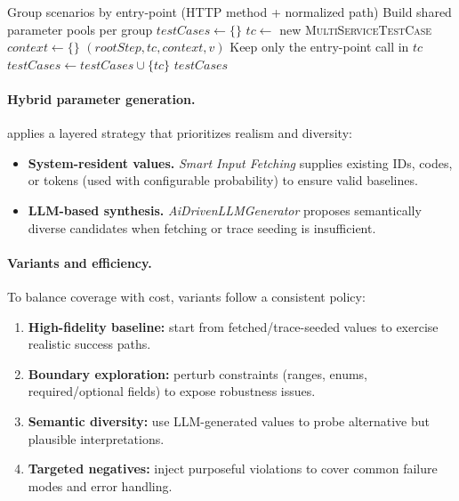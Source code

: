 \documentclass[conference]{IEEEtran}
\begin{document}
\begin{algorithm}[tb]
\caption{TEST\_GENERATOR}
\label{alg:generate}
\footnotesize
\begin{algorithmic}[1]
\Require{}
\Ensure{}
\State Group scenarios by entry-point (HTTP method + normalized path)
\State Build shared parameter pools per group
\State $testCases \gets \{\}$
        \State $tc \gets$ new \textsc{MultiServiceTestCase}
        \State $context \gets \{\}$ 
            \State {}$(rootStep, tc, context, v)$
        \EndFor
        \State Keep only the entry-point call in $tc$ 
        \State $testCases \gets testCases \cup \{tc\}$
    \EndFor
\EndFor
\State \Return $testCases$
\end{algorithmic}
\end{algorithm}

\paragraph{Hybrid parameter generation.}
 applies a layered strategy that prioritizes realism and diversity:
\begin{itemize}[leftmargin=*]
  \item \textbf{System-resident values.} \emph{Smart Input Fetching} supplies existing IDs, codes, or tokens (used with configurable probability) to ensure valid baselines.
  \item \textbf{LLM-based synthesis.} \emph{AiDrivenLLMGenerator} proposes semantically diverse candidates when fetching or trace seeding is insufficient.
\end{itemize}

\paragraph{Variants and efficiency.}
To balance coverage with cost, variants follow a consistent policy:
\begin{enumerate}[leftmargin=*]
  \item \textbf{High-fidelity baseline:} start from fetched/trace-seeded values to exercise realistic success paths.
  \item \textbf{Boundary exploration:} perturb constraints (ranges, enums, required/optional fields) to expose robustness issues.
  \item \textbf{Semantic diversity:} use LLM-generated values to probe alternative but plausible interpretations.
  \item \textbf{Targeted negatives:} inject purposeful violations to cover common failure modes and error handling.
\end{enumerate}
\end{document}
